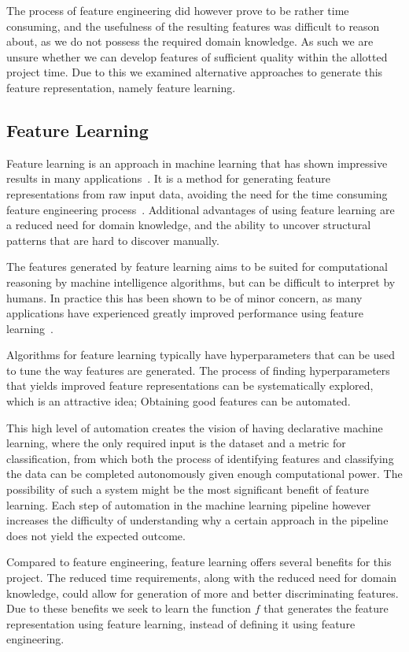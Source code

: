 The process of feature engineering did however prove to be rather time consuming, and the usefulness of the resulting features was difficult to reason about, as we do not possess the required domain knowledge. As such we are unsure whether we can develop features of sufficient quality within the allotted project time. Due to this we examined alternative approaches to generate this feature representation, namely feature learning.


\subsection{Feature Learning}
Feature learning is an approach in machine learning that has shown impressive results in many applications~\cite{bengio2013representation}. It is a method for generating feature representations from raw input data, avoiding the need for the time consuming feature engineering process~\cite{ng-lecture}. Additional advantages of using feature learning are a reduced need for domain knowledge, and the ability to uncover structural patterns that are hard to discover manually.

The features generated by feature learning aims to be suited for computational reasoning by machine intelligence algorithms, but can be difficult to interpret by humans. In practice this has been shown to be of minor concern, as many applications have experienced greatly improved performance using feature learning~\cite{bengio2013representation}.

Algorithms for feature learning typically have hyperparameters that can be used to tune the way features are generated. The process of finding hyperparameters that yields improved feature representations can be systematically explored, which is an attractive idea; Obtaining good features can be automated.

This high level of automation creates the vision of having declarative machine learning, where the only required input is the dataset and a metric for classification, from which both the process of identifying features and classifying the data can be completed autonomously given enough computational power. The possibility of such a system might be the most significant benefit of feature learning. Each step of automation in the machine learning pipeline however increases the difficulty of understanding why a certain approach in the pipeline does not yield the expected outcome.

Compared to feature engineering, feature learning offers several benefits for this project. The reduced time requirements, along with the reduced need for domain knowledge, could allow for generation of more and better discriminating features. Due to these benefits we seek to learn the function $f$ that generates the feature representation using feature learning, instead of defining it using feature engineering.
